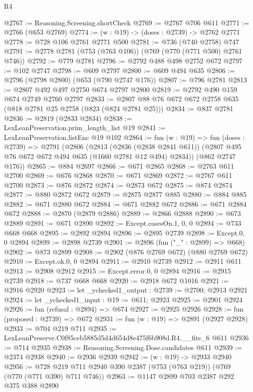 \begin{lexlean}{R4}
\begin{coremodule}
@2767 := Reasoning.Screening.shortCheck
@2769 := @2767 @706 @611
@2771 := @2766 (@653 @2769)
@2774 := (w : @19) -> (doses : @2739) -> @2762 @2771
@2778 := @728 @106 @2761 @2771 @500
@2781 := @736 (@740 @2758) @747
@2791 := @2778 @2781 (@753 (@763 @106)) (@769 (@770 (@771 @500) @2761 @746))
@2792 := @779 @2781
@2796 := @2792 @488 @498 @2752 @672
@2797 := @102 @2747
@2798 := @609 @2797
@2800 := @609 @494 @635
@2806 := @2796 (@2798 @2800) (@653 (@790 @2747 @176))
@2807 := @796 @2781
@2813 := @2807 @492 @497 @2750 @674 @2797 @2800
@2819 := @2792 @490 @159 @674 @2749 @2760 @2797
@2833 := @2807 @88 @76 @672 @672 @2758 @635 (@818 @2781 @25 @2758 (@823 (@824 @2781 @25)))
@2834 := @837 @2781
@2836 := @2819 (@2833 @2834)
@2838 := LexLeanPreservation.prim_length_list @19
@2841 := LexLeanPreservation.listEnc @19 @102
@2864 := fun (w : @19) =>
  fun (doses : @2739) =>
  @2791
    (@2806
      (@2813
        (@2836 (@2838 @2841 @611))
        (@2807 @495 @76 @672 @672 @494 @635 (@1660 @2781 @12 @494) @2834))
      (@862 @2747 @176))
@2865 := @884 @2697
@2866 := @671 @2865
@2868 := @2763 @611 @2700
@2869 := @676 @2868
@2870 := @671 @2869
@2872 := @2767 @611 @2700
@2873 := @876 @2872
@2874 := @2873 @672
@2875 := @874 @2874
@2877 := @880 @2872 @672
@2879 := @2875 @2877 @885
@2880 := @884 @885
@2882 := @671 @2880 @672
@2884 := @671 @2882 @672
@2886 := @671 @2884 @672
@2888 := @2870 (@2879 @2886)
@2889 := @2866 @2888
@2890 := @673 @2889
@2891 := @671 @2890
@2892 := Except.casesOn.{1, 0, 0}
@2894 := @733 @668 @668
@2895 := @2892 @2894
@2896 := @2895 @2739
@2898 := Except.{0, 0} @2894
@2899 := @2898 @2739
@2901 := @2896 (fun ("_" : @2899) => @668)
@2902 := @873 @2899
@2908 := @2902 (@876 @2769 @672) (@880 @2769 @672)
@2910 := Except.ok.{0, 0} @2894
@2911 := @2910 @2739
@2912 := @2911 @611
@2913 := @2908 @2912
@2915 := Except.error.{0, 0} @2894
@2916 := @2915 @2739
@2918 := @737 @668 @668
@2920 := @2918 @672 @1016
@2921 := @2916 @2920
@2923 := let _ychecked1_output : @2739 := @2700; @2913 @2921
@2924 := let _ychecked1_input : @19 := @611; @2923
@2925 := @2901 @2924
@2926 := fun (refusal : @2894) => @674
@2927 := @2925 @2926
@2928 := fun (proposed : @2739) => @672
@2931 := fun (w : @19) => @2891 (@2927 @2928)
@2933 := @704 @219 @711
@2935 := LexLeanPreserve.C0f85ceb5885d5d4d654d8e475f6b908d.R4.__fits_6 @611
@2936 := @714 @2935
@2938 := Reasoning.Screening.Dose.candidates @611
@2939 := @2374 @2938
@2940 := @2936 @2939
@2942 := (w : @19) -> @2933 @2940
@2956 := @728 @219 @711 @2940 @390 @2387 (@753 (@763 @219)) (@769 (@770 (@771 @390) @711 @746))
@2963 := @1147 @2899 @703 @2387 @292 @375 @388 @2890

\end{coremodule}
\end{lexlean}
